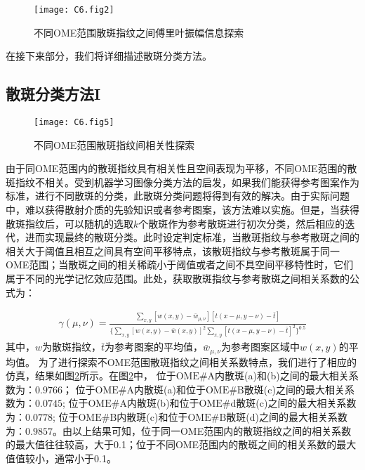 \begin{figure}[htp]
	\centering
	\texttt{[image: C6.fig2]}
	\caption{不同OME范围散斑指纹之间傅里叶振幅信息探索}
	\label{fig:6.2}
\end{figure}
在接下来部分，我们将详细描述散斑分类方法。

\subsection{散斑分类方法I}

\begin{figure}[htp]
	\centering
	\texttt{[image: C6.fig5]}
	\caption{不同OME范围散斑指纹间相关性探索}
	\label{fig:6.5}
\end{figure}

由于同OME范围内的散斑指纹具有相关性且空间表现为平移，不同OME范围的散斑指纹不相关。受到机器学习图像分类方法的启发，如果我们能获得参考图案作为标准，进行不同散斑的分类，此散斑分类问题将得到有效的解决。由于实际问题中，难以获得散射介质的先验知识或者参考图案，该方法难以实施。但是，当获得散斑指纹后，可以随机的选取$k$个散斑作为参考散斑进行初次分类，然后相应的迭代，进而实现最终的散斑分类。此时设定判定标准，当散斑指纹与参考散斑之间的相关大于阈值且相互之间具有空间平移特点，该散斑指纹与参考散斑属于同一OME范围；当散斑之间的相关稀疏小于阈值或者之间不具空间平移特性时，它们属于不同的光学记忆效应范围。此处，获取散斑指纹与参考散斑之间相关系数的公式为：

\begin{equation}
\begin{aligned}
\gamma (\mu,\nu) = \frac{\sum_{x,y} [w(x,y)- \bar{w}_{\mu,\nu}] [t(x-\mu,y-\nu)- \bar{t}]}{\{ \sum_{x,y} [w(x,y)- \bar{w}(x,y)]^2 \sum_{x,y} [t(x-\mu,y-\nu)- \bar{t}]^2  \}^{0.5}}
\label{eq:6.5}
\end{aligned}
\end{equation}
其中，$w$为散斑指纹，$\bar{t}$为参考图案的平均值，$\bar{w}_{\mu,\nu}$为参考图案区域中$w(x,y)$的平均值。
为了进行探索不OME范围散斑指纹之间相关系数特点，我们进行了相应的仿真，结果如图\ref{fig:6.5}所示。在图\ref{fig:6.5}中，
位于$\mbox{OME} \# \mbox{A}$内散斑(a)和(b)之间的最大相关系数为：$0.9766$；
位于$\mbox{OME} \# \mbox{A}$内散斑(a)和位于$\mbox{OME} \# \mbox{B}$散斑(c)之间的最大相关系数为：$0.0745$;
位于$\mbox{OME} \# \mbox{A}$内散斑(b)和位于$\mbox{OME} \# \mbox{d}$散斑(c)之间的最大相关系数为：$0.0778$;
位于$\mbox{OME} \# \mbox{B}$内散斑(c)和位于$\mbox{OME} \# \mbox{B}$散斑(d)之间的最大相关系数为：$0.9857$。由以上结果可知，位于同一OME范围内的散斑指纹之间的相关系数的最大值往往较高，大于0.1；位于不同OME范围内的散斑之间的相关系数的最大值值较小，通常小于0.1。

